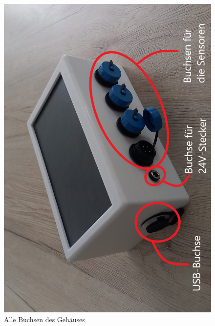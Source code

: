 \newpage
\begin{figure}[h]
    \centering
    \includegraphics[width=0.9\linewidth]{Images/Gehause.bmp.png}
    \caption{Alle Buchsen des Gehäuses}
    \label{fig:Buchsen}
\end{figure}